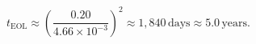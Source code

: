 \documentclass[preview]{standalone}
\begin{document}
\[
t_{\mathrm{EOL}} \approx \left(\frac{0.20}{4.66 \times 10^{-3}}\right)^2 \approx 1{,}840\,\mathrm{days} \approx 5.0\,\mathrm{years}.
\]
\end{document}
